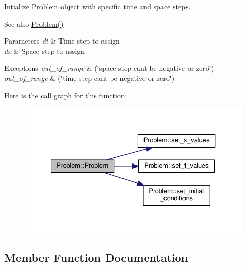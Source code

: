 Intialize \hyperlink{classProblem}{Problem} object with specific time and space steps. 

\begin{DoxySeeAlso}{See also}
\hyperlink{classProblem_ad9d44f0ef936fb62f0ce41dd200494ac}{Problem()} 
\end{DoxySeeAlso}

\begin{DoxyParams}{Parameters}
{\em dt} & Time step to assign \\
\hline
{\em dx} & Space step to assign \\
\hline
\end{DoxyParams}

\begin{DoxyExceptions}{Exceptions}
{\em out\+\_\+of\+\_\+range} & (\char`\"{}space step can\textquotesingle{}t be negative or zero\char`\"{}) \\
\hline
{\em out\+\_\+of\+\_\+range} & (\char`\"{}time step can\textquotesingle{}t be negative or zero\char`\"{}) \\
\hline
\end{DoxyExceptions}


Here is the call graph for this function\+:
\nopagebreak
\begin{figure}[H]
\begin{center}
\leavevmode
\includegraphics[width=327pt]{classProblem_a2bd30352a90746e7b2c8233c59536259_cgraph}
\end{center}
\end{figure}




\subsection{Member Function Documentation}
